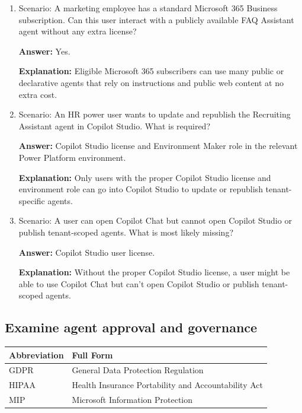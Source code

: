 \documentclass[10pt]{article}
\begin{document}
\begin{enumerate}[leftmargin=*]
\item Scenario: A marketing employee has a standard Microsoft 365 Business subscription. Can this user interact with a publicly available FAQ Assistant agent without any extra license?

\textbf{Answer:} Yes.

\textbf{Explanation:} Eligible Microsoft 365 subscribers can use many public or declarative agents that rely on instructions and public web content at no extra cost.

\item Scenario: An HR power user wants to update and republish the Recruiting Assistant agent in Copilot Studio. What is required?

\textbf{Answer:} Copilot Studio license and Environment Maker role in the relevant Power Platform environment.

\textbf{Explanation:} Only users with the proper Copilot Studio license and environment role can go into Copilot Studio to update or republish tenant-specific agents.

\item Scenario: A user can open Copilot Chat but cannot open Copilot Studio or publish tenant-scoped agents. What is most likely missing?

\textbf{Answer:} Copilot Studio user license.

\textbf{Explanation:} Without the proper Copilot Studio license, a user might be able to use Copilot Chat but can’t open Copilot Studio or publish tenant-scoped agents.

\end{enumerate}

\clearpage
\subsection{Examine agent approval and governance}

\begin{center}
\begin{tabular}{>{\raggedright\arraybackslash}p{} >{\raggedright\arraybackslash}p{}}
\toprule
\textbf{Abbreviation} & \textbf{Full Form} \\
\midrule
GDPR & General Data Protection Regulation \\
HIPAA & Health Insurance Portability and Accountability Act \\
MIP & Microsoft Information Protection \\
\bottomrule
\end{tabular}
\end{center}
\end{document}
